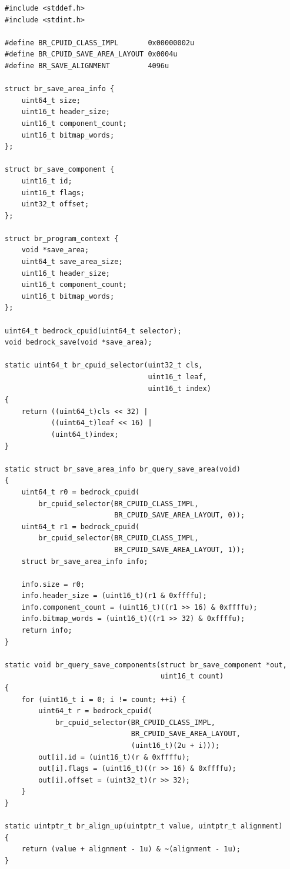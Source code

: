 \par\begingroup\footnotesize
\begin{verbatim}
#include <stddef.h>
#include <stdint.h>

#define BR_CPUID_CLASS_IMPL       0x00000002u
#define BR_CPUID_SAVE_AREA_LAYOUT 0x0004u
#define BR_SAVE_ALIGNMENT         4096u

struct br_save_area_info {
    uint64_t size;
    uint16_t header_size;
    uint16_t component_count;
    uint16_t bitmap_words;
};

struct br_save_component {
    uint16_t id;
    uint16_t flags;
    uint32_t offset;
};

struct br_program_context {
    void *save_area;
    uint64_t save_area_size;
    uint16_t header_size;
    uint16_t component_count;
    uint16_t bitmap_words;
};

uint64_t bedrock_cpuid(uint64_t selector);
void bedrock_save(void *save_area);

static uint64_t br_cpuid_selector(uint32_t cls,
                                  uint16_t leaf,
                                  uint16_t index)
{
    return ((uint64_t)cls << 32) |
           ((uint64_t)leaf << 16) |
           (uint64_t)index;
}

static struct br_save_area_info br_query_save_area(void)
{
    uint64_t r0 = bedrock_cpuid(
        br_cpuid_selector(BR_CPUID_CLASS_IMPL,
                          BR_CPUID_SAVE_AREA_LAYOUT, 0));
    uint64_t r1 = bedrock_cpuid(
        br_cpuid_selector(BR_CPUID_CLASS_IMPL,
                          BR_CPUID_SAVE_AREA_LAYOUT, 1));
    struct br_save_area_info info;

    info.size = r0;
    info.header_size = (uint16_t)(r1 & 0xffffu);
    info.component_count = (uint16_t)((r1 >> 16) & 0xffffu);
    info.bitmap_words = (uint16_t)((r1 >> 32) & 0xffffu);
    return info;
}

static void br_query_save_components(struct br_save_component *out,
                                     uint16_t count)
{
    for (uint16_t i = 0; i != count; ++i) {
        uint64_t r = bedrock_cpuid(
            br_cpuid_selector(BR_CPUID_CLASS_IMPL,
                              BR_CPUID_SAVE_AREA_LAYOUT,
                              (uint16_t)(2u + i)));
        out[i].id = (uint16_t)(r & 0xffffu);
        out[i].flags = (uint16_t)((r >> 16) & 0xffffu);
        out[i].offset = (uint32_t)(r >> 32);
    }
}

static uintptr_t br_align_up(uintptr_t value, uintptr_t alignment)
{
    return (value + alignment - 1u) & ~(alignment - 1u);
}


\end{verbatim}
